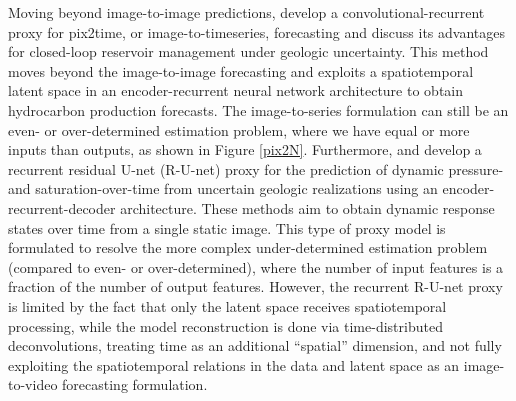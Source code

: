 \documentclass[10pt, twoside]{article}
\begin{document}
Moving beyond image-to-image predictions, \citet{Kim2023} develop a convolutional-recurrent proxy for pix2time, or image-to-timeseries, forecasting and discuss its advantages for closed-loop reservoir management under geologic uncertainty. This method moves beyond the image-to-image forecasting and exploits a spatiotemporal latent space in an encoder-recurrent neural network architecture to obtain hydrocarbon production forecasts. The image-to-series formulation can still be an even- or over-determined estimation problem, where we have equal or more inputs than outputs, as shown in Figure \ref{pix2N}. Furthermore, \citet{Tang2020, Tang2021} and \citet{Jiang2023} develop a recurrent residual U-net (R-U-net) proxy for the prediction of dynamic pressure- and saturation-over-time from uncertain geologic realizations using an encoder-recurrent-decoder architecture. These methods aim to obtain dynamic response states over time from a single static image. This type of proxy model is formulated to resolve the more complex under-determined estimation problem (compared to even- or over-determined), where the number of input features is a fraction of the number of output features. However, the recurrent R-U-net proxy is limited by the fact that only the latent space receives spatiotemporal processing, while the model reconstruction is done via time-distributed deconvolutions, treating time as an additional “spatial” dimension, and not fully exploiting the spatiotemporal relations in the data and latent space as an image-to-video forecasting formulation.
\end{document}
